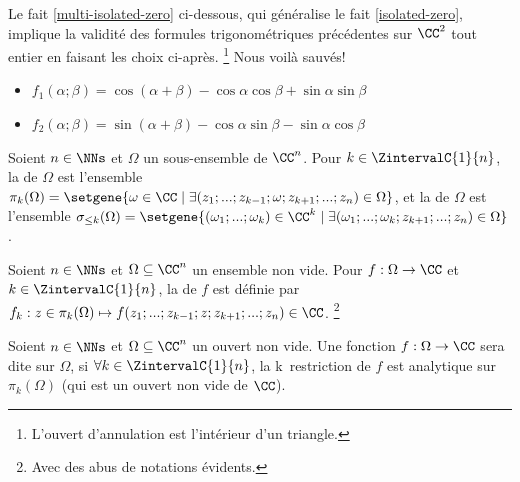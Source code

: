 Le fait \ref{multi-isolated-zero} ci-dessous, qui généralise le fait \ref{isolated-zero}, implique la validité des formules trigonométriques précédentes sur $\CC^2$ tout entier en faisant les choix ci-après.%
\footnote{
    L'ouvert d'annulation est l'intérieur d'un triangle.
}
Nous voilà sauvés!
%
\begin{itemize}[label=\small\textbullet]
	\item $f_1(\alpha ; \beta) = \cos(\alpha + \beta) - \cos \alpha \cos \beta + \sin \alpha \sin \beta$

	\item $f_2(\alpha ; \beta) = \sin(\alpha + \beta) - \cos \alpha \sin \beta - \sin \alpha \cos \beta$
\end{itemize}




\newpage





\begin{defi}
    Soient $n \in \NNs$
    et
    $\Omega$ un sous-ensemble de $\CC^n$.
    Pour $k \in \ZintervalC{1}{n}$,
    la  de $\Omega$ est l'ensemble $\pi_k(\Omega) = \setgene{\omega \in \CC \mid \exists (z_1 ; ... ; z_{k-1} ; \omega ; z_{k+1} ; ... ; z_n) \in \Omega}$,
    et
    la  de $\Omega$ est l'ensemble $\sigma_{\leq k}(\Omega) = \setgene{(\omega_1 ; ... ; \omega_k) \in \CC^k \mid \exists (\omega_1 ; ... ; \omega_k ; z_{k+1} ; ... ; z_n) \in \Omega}$.
    
\end{defi}



\begin{defi}
    Soient $n \in \NNs$
    et
    $\Omega \subseteq \CC^n$ un ensemble non vide.
    Pour $f: \Omega \rightarrow \CC$
    et
    $k \in \ZintervalC{1}{n}$,
    la  de $f$ est définie par
    $f_k: z \in \pi_k(\Omega) \mapsto f(z_1 ; ... ; z_{k-1} ; z ; z_{k+1} ; ... ; z_n) \in \CC$.%
	\footnote{
		Avec des abus de notations évidents.
	}
\end{defi}


\begin{defi}
    Soient $n \in \NNs$
    et
    $\Omega \subseteq \CC^n$ un ouvert non vide.
    Une fonction $f: \Omega \rightarrow \CC$ sera dite  sur $\Omega$,
    si $\forall k \in \ZintervalC{1}{n}$,
    la k\ieme\ restriction de $f$ est analytique sur $\pi_k(\Omega)$ (qui est un ouvert non vide de $\CC$).
\end{defi}


